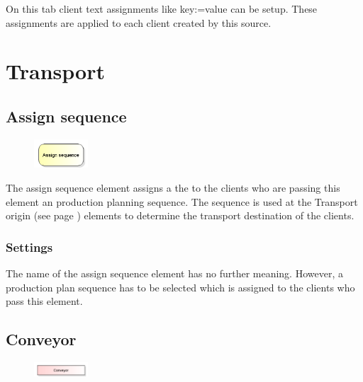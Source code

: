 On this tab client text assignments like key:=value can be setup.
These assignments are applied to each client created by this source.





\chapter{Transport}

\section{Assign sequence}
\label{ref:ModelElementAssignSequence}

\begin{figure}
\vspace{-22pt}
\includegraphics[width=2cm]{imageModelElementAssignSequence.png}
\vspace{-22pt}
\end{figure}

The assign sequence element assigns a the to the clients who are passing this element an production planning
sequence. The sequence is used at the Transport origin (see page \pageref{ref:ModelElementTransportSource}) 
elements to determine the transport destination of the clients.

\subsection*{Settings}

The name of the assign sequence element has no further meaning. However, a production plan sequence
has to be selected which is assigned to the clients who pass this element.


\section{Conveyor}
\label{ref:ModelElementConveyor}

\begin{figure}
\vspace{-22pt}
\includegraphics[width=2cm]{imageModelElementConveyor.png}
\vspace{-22pt}
\end{figure}

